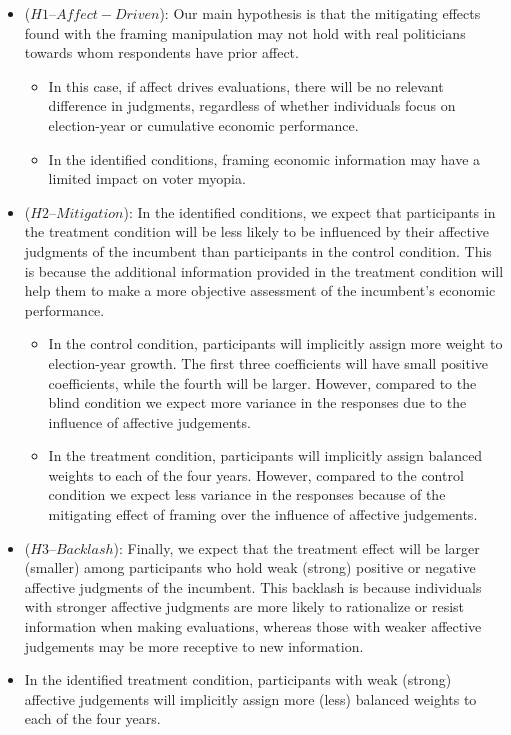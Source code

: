 \documentclass[
]{article}
\providecommand{\tightlist}{%
  \setlength{\itemsep}{0pt}\setlength{\parskip}{0pt}}
\begin{document}
\begin{itemize}
\tightlist
\item
  (\(H1 – Affect-Driven\)): Our main hypothesis is that the mitigating
  effects found with the framing manipulation may not hold with real
  politicians towards whom respondents have prior affect.

  \begin{itemize}
  \tightlist
  \item
    In this case, if affect drives evaluations, there will be no
    relevant difference in judgments, regardless of whether individuals
    focus on election-year or cumulative economic performance.
  \item
    In the identified conditions, framing economic information may have
    a limited impact on voter myopia.
  \end{itemize}
\item
  (\(H2 – Mitigation\)): In the identified conditions, we expect that
  participants in the treatment condition will be less likely to be
  influenced by their affective judgments of the incumbent than
  participants in the control condition. This is because the additional
  information provided in the treatment condition will help them to make
  a more objective assessment of the incumbent's economic performance.

  \begin{itemize}
  \tightlist
  \item
    In the control condition, participants will implicitly assign more
    weight to election-year growth. The first three coefficients will
    have small positive coefficients, while the fourth will be larger.
    However, compared to the blind condition we expect more variance in
    the responses due to the influence of affective judgements.
  \item
    In the treatment condition, participants will implicitly assign
    balanced weights to each of the four years. However, compared to the
    control condition we expect less variance in the responses because
    of the mitigating effect of framing over the influence of affective
    judgements.
  \end{itemize}
\item
  (\(H3 – Backlash\)): Finally, we expect that the treatment effect will
  be larger (smaller) among participants who hold weak (strong) positive
  or negative affective judgments of the incumbent. This backlash is
  because individuals with stronger affective judgments are more likely
  to rationalize or resist information when making evaluations, whereas
  those with weaker affective judgements may be more receptive to new
  information.
\item
  In the identified treatment condition, participants with weak (strong)
  affective judgements will implicitly assign more (less) balanced
  weights to each of the four years.
\end{itemize}
\end{document}
